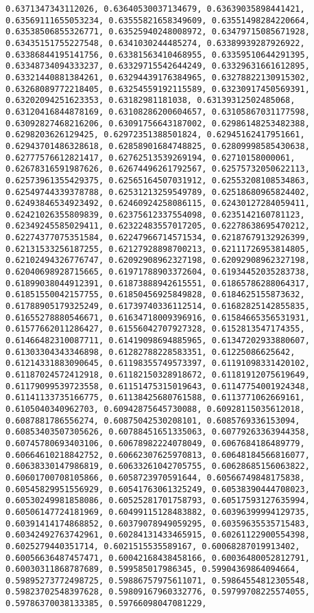 \documentclass[11pt]{article}
\begin{document}
\begin{Verbatim}[commandchars=\\\{\}]
0.6371347343112026, 0.63640530037134679, 0.63639035898441421, 0.63569111655053234, 0.63555821658349609, 0.63551498284220664, 0.63538506855326771, 0.63525940248008972, 0.63479715085671928, 0.63435151755227548, 0.6341030244485274, 0.63389939287926922, 0.63386844195141756, 0.63381563410468955, 0.63359510644291395, 0.63348734094333237, 0.63329715542644249, 0.63329631661612895, 0.63321440881384261, 0.63294439176384965, 0.63278822130915302, 0.63268089772218405, 0.63254559192115589, 0.63230917450569391, 0.63202094251623353, 0.63182981181038, 0.63139312502485068, 0.63120416844878169, 0.63108286200604657, 0.63105867031177598, 0.63092827468216206, 0.63091756643187002, 0.62986148253482388, 0.6298203626129425, 0.62972351388501824, 0.62945162417951661, 0.62943701486328618, 0.62858901684748825, 0.62809998585430638, 0.62777576612821417, 0.62762513539269194, 0.62710158000061, 0.62678316591987626, 0.62674496261792567, 0.62575732050622113, 0.62573961355429375, 0.62565164507031912, 0.62553208108534863, 0.62549744339378788, 0.62531213259549789, 0.62518680965824402, 0.62493846534923492, 0.62460924258086115, 0.62430127284059411, 0.62421026355809839, 0.62375612337554098, 0.6235142160781123, 0.62349245585029411, 0.62322483557017205, 0.62278638695470212, 0.62274377075351584, 0.62247966714571534, 0.62187679132926399, 0.62131533256187255, 0.62127928898700213, 0.62111726953814805, 0.62102494326776747, 0.62092908962327198, 0.62092908962327198, 0.62040698928715665, 0.61971788903372604, 0.61934452035283738, 0.61899038044912391, 0.61873888942615551, 0.61865786288064317, 0.61851550042157755, 0.61850456925849828, 0.6184625155873632, 0.61788905179325249, 0.61739740336112514, 0.61682825142855835, 0.61655278880546671, 0.61634718009396916, 0.61584665356531931, 0.61577662011286427, 0.61556042707927328, 0.6152813547174355, 0.61466482310087711, 0.61419098694885965, 0.61347202933880607, 0.61303304343346898, 0.61282788228583351, 0.61225086625642, 0.61214331883090645, 0.61198355749573397, 0.61191098331420102, 0.61187024572412918, 0.61182150328918672, 0.61181912075619649, 0.61179099539723558, 0.61151475315019643, 0.61147754001924348, 0.61141133735166775, 0.61138425680761588, 0.6113771062669161, 0.6105040340962703, 0.60942875645730088, 0.60928115035612018, 0.6087881786556274, 0.60875042530208101, 0.6085769336153094, 0.60853403507305626, 0.60788451651335063, 0.60779263363944358, 0.60745780693403106, 0.60678982224078049, 0.6067684186489779, 0.60664610218842752, 0.60662307625970813, 0.60648184566816077, 0.60638330147986819, 0.60633261042705755, 0.60628685156063822, 0.60601700708105866, 0.6058723970591644, 0.60566749848175838, 0.60545829951556929, 0.60541763061325249, 0.60538390444708023, 0.60530249981858086, 0.60525281701758793, 0.60517593127635994, 0.60506147724181969, 0.60499115128483882, 0.60396399994129735, 0.60391414174868852, 0.60379078949059295, 0.60359635535715483, 0.60342492763742961, 0.60284131433465915, 0.60261122900554398, 0.6025279440351714, 0.6021515535589167, 0.60068287019913402, 0.60056636487457471, 0.60042168438458166, 0.60036480052812791, 0.60030311868787689, 0.599585017986345, 0.59904369864094664, 0.59895273772498725, 0.59886757975611071, 0.59864554812305548, 0.59823702548397628, 0.59809167960332776, 0.59799708225574055, 0.59786370038133385, 0.59766098047081229, 
\end{Verbatim}
\end{document}
